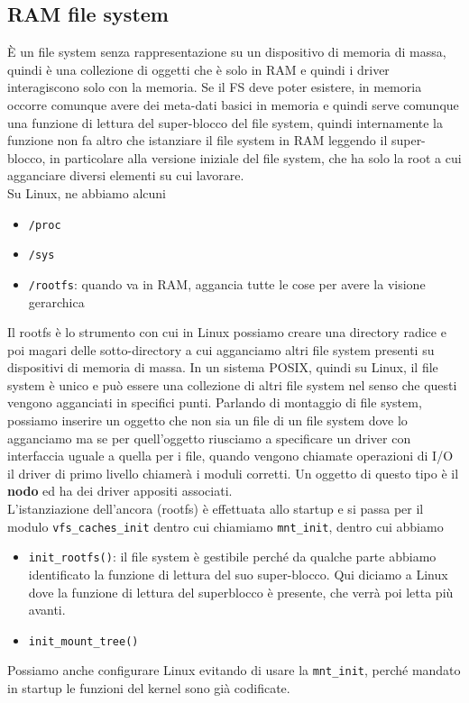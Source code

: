 \documentclass[12pt, oneside]{extbook}
\begin{document}
\subsection{RAM file system}
È un file system senza rappresentazione su un dispositivo di memoria di massa, quindi è una collezione di oggetti che è solo in RAM e quindi i driver interagiscono solo con la memoria. Se il FS deve poter esistere, in memoria occorre comunque avere dei meta-dati basici in memoria e quindi serve comunque una funzione di lettura del super-blocco del file system, quindi internamente la funzione non fa altro che istanziare il file system in RAM leggendo il super-blocco, in particolare alla versione iniziale del file system, che ha solo la root a cui agganciare diversi elementi su cui lavorare.\\Su Linux, ne abbiamo alcuni
\begin{itemize}
\item \texttt{/proc}
\item \texttt{/sys}
\item \texttt{/rootfs}: quando va in RAM, aggancia tutte le cose per avere la visione gerarchica
\end{itemize}
Il rootfs è lo strumento con cui in Linux possiamo creare una directory radice e poi magari delle sotto-directory a cui agganciamo altri file system presenti su dispositivi di memoria di massa. In un sistema POSIX, quindi su Linux, il file system è unico e può essere una collezione di altri file system nel senso che questi vengono agganciati in specifici punti. Parlando di montaggio di file system, possiamo inserire un oggetto che non sia un file di un file system dove lo agganciamo ma se per quell'oggetto riusciamo a specificare un driver con interfaccia uguale a quella per i file, quando vengono chiamate operazioni di I/O il driver di primo livello chiamerà i moduli corretti. Un oggetto di questo tipo è il \textbf{nodo} ed ha dei driver appositi associati.\\L'istanziazione dell'ancora (rootfs) è effettuata allo startup e si passa per il modulo \texttt{vfs\_caches\_init} dentro cui chiamiamo \texttt{mnt\_init}, dentro cui abbiamo
\begin{itemize}
\item \texttt{init\_rootfs()}: il file system è gestibile perché da qualche parte abbiamo identificato la funzione di lettura del suo super-blocco. Qui diciamo a Linux dove la funzione di lettura del superblocco è presente, che verrà poi letta più avanti. 
\item \texttt{init\_mount\_tree()}
\end{itemize}
Possiamo anche configurare Linux evitando di usare la \texttt{mnt\_init}, perché mandato in startup le funzioni del kernel sono già codificate.
\end{document}
